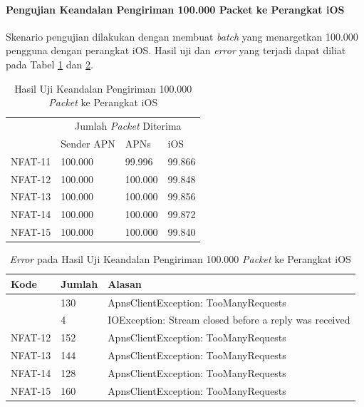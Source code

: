\paragraph{Pengujian Keandalan Pengiriman 100.000 Packet ke Perangkat iOS}
\par Skenario pengujian dilakukan dengan membuat \textit{batch} yang menargetkan 100.000 pengguna dengan perangkat iOS. Hasil uji dan \textit{error} yang terjadi dapat diliat pada Tabel \ref{t:keandalan-ios-100k} dan \ref{t:error-keandalan-ios-100k}.
\begin{longtable}{|p{1.5cm}|p{2cm}|p{2cm}|p{2cm}|}
	\caption{Hasil Uji Keandalan Pengiriman 100.000 \textit{Packet} ke Perangkat iOS} \label{t:keandalan-ios-100k} \\ \hline
	\rowcolor{lightgray} & \multicolumn{3}{c|}{Jumlah \textit{Packet} Diterima} \\ \hhline{~|*3{-}|}
	\rowcolor{lightgray} \multirow{-2}{*}{Kode} & Sender APN & APNs & iOS \\ \hline
	NFAT-11 & 100.000 & 99.996 & 99.866 \\ \hline
	NFAT-12 & 100.000 & 100.000 & 99.848 \\ \hline
	NFAT-13 & 100.000 & 100.000 & 99.856 \\ \hline
	NFAT-14 & 100.000 & 100.000 & 99.872 \\ \hline
	NFAT-15 & 100.000 & 100.000 & 99.840 \\ \hline
\end{longtable}
\begin{longtable}{|p{1.5cm}|p{1.5cm}|p{4cm}|}
\caption{\textit{Error} pada Hasil Uji Keandalan Pengiriman 100.000 \textit{Packet} ke Perangkat iOS} \label{t:error-keandalan-ios-100k} \\ \hline
\rowcolor{lightgray} Kode & Jumlah & Alasan \\ \hline
 & 130 & ApnsClientException: TooManyRequests \\ \hhline{~|*2{-}|}
\multirow{-1}{*}{NFAT-11} & 4 & IOException: Stream closed before a reply was received \\ \hline
NFAT-12 & 152 & ApnsClientException: TooManyRequests \\ \hline
NFAT-13 & 144 & ApnsClientException: TooManyRequests \\ \hline
NFAT-14 & 128 & ApnsClientException: TooManyRequests \\ \hline
NFAT-15 & 160 & ApnsClientException: TooManyRequests \\ \hline
\end{longtable}

